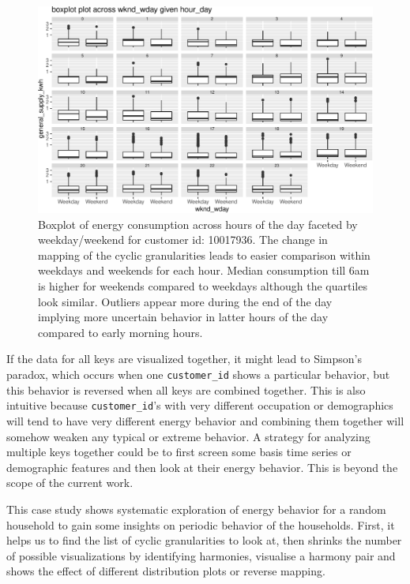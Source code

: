 \documentclass[12pt]{article}
\begin{document}
\begin{figure}

{\centering \includegraphics[width=\textwidth]{figure/cust-ridge-1} 

}

\caption{Boxplot of energy consumption across hours of the day faceted by weekday/weekend for customer id: 10017936. The change in mapping of the cyclic granularities leads to easier comparison within weekdays and weekends for each hour. Median consumption till 6am is higher for weekends compared to weekdays although the quartiles look similar. Outliers appear more during the end of the day implying more uncertain behavior in latter hours of the day compared to early morning hours.}\label{fig:cust-ridge}
\end{figure}

If the data for all keys are visualized together, it might lead to Simpson's paradox, which occurs when one \texttt{customer\_id} shows a particular behavior, but this behavior is reversed when all keys are combined together. This is also intuitive because \texttt{customer\_id}'s with very different occupation or demographics will tend to have very different energy behavior and combining them together will somehow weaken any typical or extreme behavior. A strategy for analyzing multiple keys together could be to first screen some basis time series or demographic features and then look at their energy behavior. This is beyond the scope of the current work.

This case study shows systematic exploration of energy behavior for a random household to gain some insights on periodic behavior of the households. First, it helps us to find the list of cyclic granularities to look at, then shrinks the number of possible visualizations by identifying harmonies, visualise a harmony pair and shows the effect of different distribution plots or reverse mapping.
\end{document}
